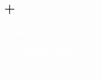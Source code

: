 \documentclass[aspectratio=169,xcolor={dvipsnames,table}]{beamer}
\begin{document}
\subsection{+}
\begin{frame}
  \centering
  \textcolor{white}{\Huge\bfseries Today's Pronunciation}

  \vspace{30pt}

  \textcolor{white}{\Large 同じ破裂音の連続}

  \textcolor{white}{\Large {} $+$ }

  \bigskip

\end{frame}
\end{document}
